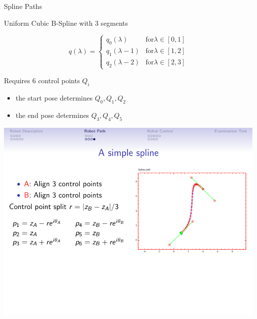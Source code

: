 \documentclass{beamer}
\begin{document}
\begin{frame}{Spline Paths}
  
  Uniform Cubic B-Spline with 3 segments
  
  \vfill
  
  \begin{minipage}{0.4\columnwidth}
    
    \[
    q(\lambda) = \begin{cases}
      q_0(\lambda)   & \text{for} \lambda\in[0,1] \\
      q_1(\lambda-1) & \text{for} \lambda\in[1,2] \\
      q_2(\lambda-2) & \text{for} \lambda\in[2,3]
    \end{cases}
    \]
    
    Requires 6 control points $Q_i$
    \begin{itemize}
    \item
      the start pose determines $Q_0, Q_1, Q_2$
    \item
      the end pose determines $Q_3, Q_4, Q_5$
    \end{itemize}
    
  \end{minipage}
  \hfill
  \begin{minipage}{0.53\columnwidth}
    \centering
    \includegraphics[width=\columnwidth]{spline-ulf-2.pdf}
  \end{minipage}
  
\end{frame}
\end{document}
